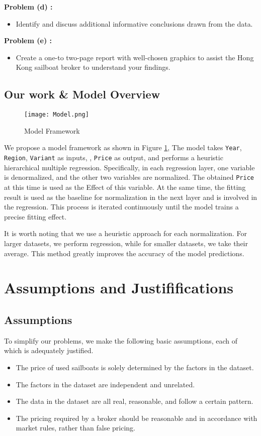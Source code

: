 \documentclass[12pt]{article}  %
\begin{document}
\textbf{Problem (d) :}
\begin{itemize}
    \item Identify and discuss additional informative conclusions drawn from the data.
\end{itemize}

\textbf{Problem (e) :}
\begin{itemize}
    \item Create a one-to two-page report with well-chosen graphics to assist the Hong Kong sailboat broker to understand your findings.
\end{itemize}
\subsection{Our work \& Model Overview}
\begin{figure}[htbp]
    \centering
    \texttt{[image: Model.png]}
    \caption{Model Framework}\label{fig:Model}
\end{figure}

We propose a model framework as shown in Figure \ref{fig:Model}, The model takes \texttt{Year}, \texttt{Region}, \texttt{Variant} as inputs, 
, \texttt{Price} as output, and performs a heuristic hierarchical multiple regression. 
Specifically, in each regression layer, one variable is denormalized, and the other two variables are normalized. 
The obtained \texttt{Price} at this time is used as the Effect of this variable. 
At the same time, the fitting result is used as the baseline for normalization in the next layer and is involved in the regression. 
This process is iterated continuously until the model trains a precise fitting effect.

It is worth noting that we use a heuristic approach for each normalization. 
For larger datasets, we perform regression, while for smaller datasets, we take their average. 
This method greatly improves the accuracy of the model predictions.
\section{Assumptions and Justififications}
\subsection{Assumptions}
To simplify our problems, we make the following basic assumptions, each of which is
adequately justified.
\begin{itemize}
    \item The price of used sailboats is solely determined by the factors in the dataset.
    \item The factors in the dataset are independent and unrelated.
    \item The data in the dataset are all real, reasonable, and follow a certain pattern.
    \item The pricing required by a broker should be reasonable and in accordance with market rules, rather than false pricing.
\end{itemize}
\end{document}

